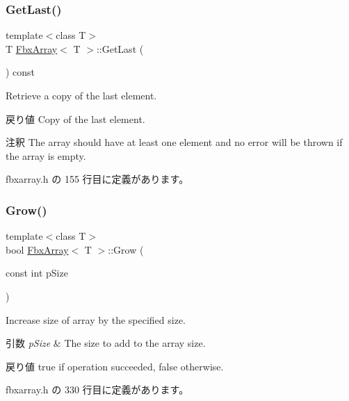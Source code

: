 \subsubsection{\texorpdfstring{Get\+Last()}{GetLast()}}
{\footnotesize\ttfamily template$<$class T$>$ \\
T \hyperlink{class_fbx_array}{Fbx\+Array}$<$ T $>$\+::Get\+Last (\begin{DoxyParamCaption}{ }\end{DoxyParamCaption}) const\hspace{0.3cm}{\ttfamily [inline]}}

Retrieve a copy of the last element. \begin{DoxyReturn}{戻り値}
Copy of the last element. 
\end{DoxyReturn}
\begin{DoxyRemark}{注釈}
The array should have at least one element and no error will be thrown if the array is empty. 
\end{DoxyRemark}


 fbxarray.\+h の 155 行目に定義があります。

\mbox{\label{class_fbx_array_a5d4cc67b153105946b82b178b7240a5a}} 
\subsubsection{\texorpdfstring{Grow()}{Grow()}}
{\footnotesize\ttfamily template$<$class T$>$ \\
bool \hyperlink{class_fbx_array}{Fbx\+Array}$<$ T $>$\+::Grow (\begin{DoxyParamCaption}\item[{const int}]{p\+Size }\end{DoxyParamCaption})\hspace{0.3cm}{\ttfamily [inline]}}

Increase size of array by the specified size. 
\begin{DoxyParams}{引数}
{\em p\+Size} & The size to add to the array size. \\
\hline
\end{DoxyParams}
\begin{DoxyReturn}{戻り値}
{\ttfamily true} if operation succeeded, {\ttfamily false} otherwise. 
\end{DoxyReturn}


 fbxarray.\+h の 330 行目に定義があります。

